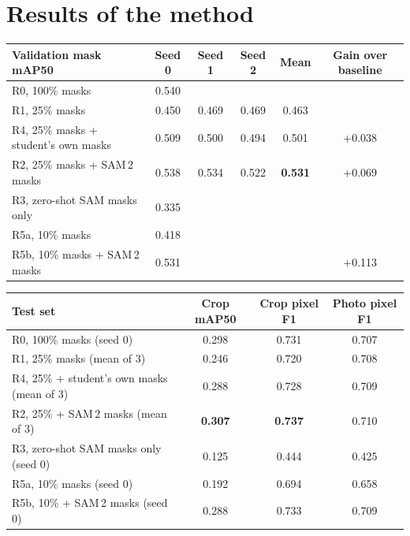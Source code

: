 \documentclass[11pt,a4paper]{article}
\begin{document}
\section{Results of the method}
\begin{center}\small
\begin{tabular}{lccccc}
\toprule
Validation mask mAP50 & Seed 0 & Seed 1 & Seed 2 & Mean & Gain over baseline\\
\midrule
R0, 100\% masks & 0.540 & & & & \\
R1, 25\% masks & 0.450 & 0.469 & 0.469 & 0.463 & \\
R4, 25\% masks + student's own masks & 0.509 & 0.500 & 0.494 & 0.501 & +0.038\\
R2, 25\% masks + SAM\,2 masks & 0.538 & 0.534 & 0.522 & \textbf{0.531} & +0.069\\
R3, zero-shot SAM masks only & 0.335 & & & & \\
\midrule
R5a, 10\% masks & 0.418 & & & & \\
R5b, 10\% masks + SAM\,2 masks & 0.531 & & & & +0.113\\
\bottomrule
\end{tabular}\end{center}

\begin{center}\small
\begin{tabular}{lccc}
\toprule
Test set & Crop mAP50 & Crop pixel F1 & Photo pixel F1\\
\midrule
R0, 100\% masks (seed 0) & 0.298 & 0.731 & 0.707\\
R1, 25\% masks (mean of 3) & 0.246 & 0.720 & 0.708\\
R4, 25\% + student's own masks (mean of 3) & 0.288 & 0.728 & 0.709\\
R2, 25\% + SAM\,2 masks (mean of 3) & \textbf{0.307} & \textbf{0.737} & 0.710\\
R3, zero-shot SAM masks only (seed 0) & 0.125 & 0.444 & 0.425\\
\midrule
R5a, 10\% masks (seed 0) & 0.192 & 0.694 & 0.658\\
R5b, 10\% + SAM\,2 masks (seed 0) & 0.288 & 0.733 & 0.709\\
\bottomrule
\end{tabular}\end{center}
\end{document}
